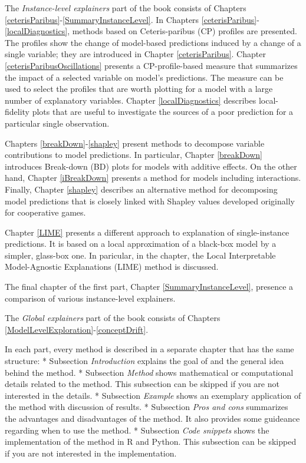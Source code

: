 \documentclass[12pt,]{krantz}
\begin{document}
The \emph{Instance-level explainers} part of the book consists of Chapters \ref{ceterisParibus}-\ref{SummaryInstanceLevel}. In Chapters \ref{ceterisParibus}-\ref{localDiagnostics}, methods based on Ceteris-paribus (CP) profiles are presented. The profiles show the change of model-based predictions induced by a change of a single variable; they are introduced in Chapter \ref{ceterisParibus}. Chapter \ref{ceterisParibusOscillations} presents a CP-profile-based measure that summarizes the impact of a selected variable on model's predictions. The measure can be used to select the profiles that are worth plotting for a model with a large number of explanatory variables. Chapter \ref{localDiagnostics} describes local-fidelity plots that are useful to investigate the sources of a poor prediction for a particular single observation.

Chapters \ref{breakDown}-\ref{shapley} present methods to decompose variable contributions to model predictions. In particular, Chapter \ref{breakDown} introduces Break-down (BD) plots for models with additive effects. On the other hand, Chapter \ref{iBreakDown} presents a method for models including interactions. Finally, Chapter \ref{shapley} describes an alternative method for decomposing model predictions that is closely linked with Shapley values \citep{shapleybook1952} developed originally for cooperative games.

Chapter \ref{LIME} presents a different approach to explanation of single-instance predictions. It is based on a local approximation of a black-box model by a simpler, glass-box one. In paricular, in the chapter, the Local Interpretable Model-Agnostic Explanations (LIME) method \citep{lime} is discussed.

The final chapter of the first part, Chapter \ref{SummaryInstanceLevel}, presence a comparison of various instance-level explainers.

The \emph{Global explainers} part of the book consists of Chapters \ref{ModelLevelExploration}-\ref{conceptDrift}.

In each part, every method is described in a separate chapter that has the same structure:
* Subsection \emph{Introduction} explains the goal of and the general idea behind the method.
* Subsection \emph{Method} shows mathematical or computational details related to the method. This subsection can be skipped if you are not interested in the details.
* Subsection \emph{Example} shows an exemplary application of the method with discussion of results.
* Subsection \emph{Pros and cons} summarizes the advantages and disadvantages of the method. It also provides some guideance regarding when to use the method.
* Subsection \emph{Code snippets} shows the implementation of the method in R and Python. This subsection can be skipped if you are not interested in the implementation.
\end{document}
